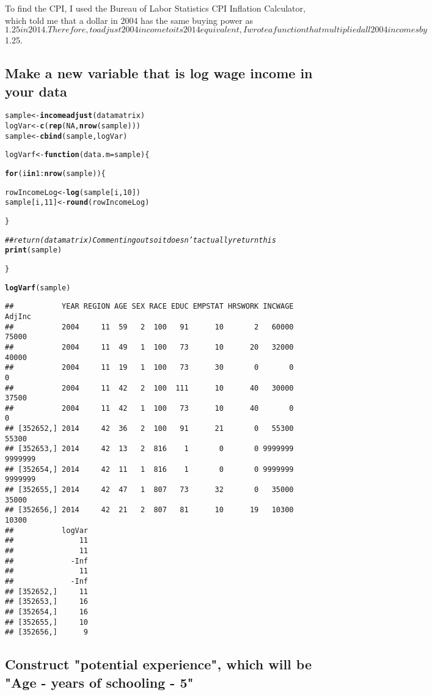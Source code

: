 \documentclass{article}\usepackage[]{graphicx}\usepackage[]{color}
\makeatletter
\newcommand{\hlnum}[1]{\textcolor[rgb]{0.686,0.059,0.569}{#1}}%
\newcommand{\hlcom}[1]{\textcolor[rgb]{0.678,0.584,0.686}{\textit{#1}}}%
\newcommand{\hlopt}[1]{\textcolor[rgb]{0,0,0}{#1}}%
\newcommand{\hlstd}[1]{\textcolor[rgb]{0.345,0.345,0.345}{#1}}%
\newcommand{\hlkwa}[1]{\textcolor[rgb]{0.161,0.373,0.58}{\textbf{#1}}}%
\newcommand{\hlkwb}[1]{\textcolor[rgb]{0.69,0.353,0.396}{#1}}%
\newcommand{\hlkwc}[1]{\textcolor[rgb]{0.333,0.667,0.333}{#1}}%
\newcommand{\hlkwd}[1]{\textcolor[rgb]{0.737,0.353,0.396}{\textbf{#1}}}%
\newenvironment{kframe}{%
 \def\at@end@of@kframe{}%
 \ifinner\ifhmode%
  \def\at@end@of@kframe{\end{minipage}}%
  \begin{minipage}{\columnwidth}%
 \fi\fi%
 \def\FrameCommand##1{\hskip\@totalleftmargin \hskip-\fboxsep
 \colorbox{shadecolor}{##1}\hskip-\fboxsep
     \hskip-\linewidth \hskip-\@totalleftmargin \hskip\columnwidth}%
 \MakeFramed {\advance\hsize-\width
   \@totalleftmargin\z@ \linewidth\hsize
   \@setminipage}}%
 {\par\unskip\endMakeFramed%
 \at@end@of@kframe}
\newenvironment{knitrout}{}{} %
\makeatother
\begin{document}
To find the CPI, I used the Bureau of Labor Statistics CPI Inflation Calculator, which told me that a dollar in 2004 has the same buying power as $1.25 in 2014. Therefore, to adjust 2004 income to its 2014 equivalent, I wrote a function that multiplied all 2004 incomes by $1.25.

\subsection{Make a new variable that is log wage income in your data}

\begin{knitrout}
\color{fgcolor}\begin{kframe}
\begin{alltt}
\hlstd{sample} \hlkwb{<-} \hlkwd{incomeadjust}\hlstd{(datamatrix)}
\hlstd{logVar} \hlkwb{<-} \hlkwd{c}\hlstd{(}\hlkwd{rep}\hlstd{(}\hlnum{NA}\hlstd{,} \hlkwd{nrow}\hlstd{(sample)))}
\hlstd{sample} \hlkwb{<-} \hlkwd{cbind}\hlstd{(sample, logVar)}



\hlstd{logVarf} \hlkwb{<-} \hlkwa{function}\hlstd{(}\hlkwc{data.m} \hlstd{= sample)\{}

  \hlkwa{for} \hlstd{(i} \hlkwa{in} \hlnum{1}\hlopt{:}\hlkwd{nrow}\hlstd{(sample))\{}

    \hlstd{rowIncomeLog} \hlkwb{<-} \hlkwd{log}\hlstd{(sample[i,}\hlnum{10}\hlstd{])}
    \hlstd{sample[i,}\hlnum{11}\hlstd{]} \hlkwb{<-} \hlkwd{round}\hlstd{(rowIncomeLog)}

  \hlstd{\}}

  \hlcom{## return(datamatrix) Commenting out so it doesn't actually return this}
  \hlkwd{print}\hlstd{(sample)}

\hlstd{\}}

\hlkwd{logVarf}\hlstd{(sample)}
\end{alltt}
\begin{verbatim}
##           YEAR REGION AGE SEX RACE EDUC EMPSTAT HRSWORK INCWAGE  AdjInc
##           2004     11  59   2  100   91      10       2   60000   75000
##           2004     11  49   1  100   73      10      20   32000   40000
##           2004     11  19   1  100   73      30       0       0       0
##           2004     11  42   2  100  111      10      40   30000   37500
##           2004     11  42   1  100   73      10      40       0       0
## [352652,] 2014     42  36   2  100   91      21       0   55300   55300
## [352653,] 2014     42  13   2  816    1       0       0 9999999 9999999
## [352654,] 2014     42  11   1  816    1       0       0 9999999 9999999
## [352655,] 2014     42  47   1  807   73      32       0   35000   35000
## [352656,] 2014     42  21   2  807   81      10      19   10300   10300
##           logVar
##               11
##               11
##             -Inf
##               11
##             -Inf
## [352652,]     11
## [352653,]     16
## [352654,]     16
## [352655,]     10
## [352656,]      9
\end{verbatim}
\end{kframe}
\end{knitrout}

\subsection{Construct "potential experience", which will be "Age - years of schooling - 5"}
\end{document}
